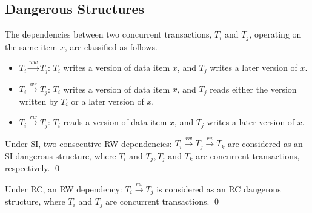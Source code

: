 
\subsection{Dangerous Structures\label{sec:back.vd}}
The dependencies between two concurrent transactions, $T_i$ and $T_j$, operating on the same item $x$, are classified as follows.

\begin{itemize}[leftmargin=*]
    \item $T_i \xrightarrow{ww} T_j$: $T_i$ writes a version of data item $x$, and $T_j$ writes a later version of $x$.
    \item $T_i \xrightarrow{wr} T_j$: $T_i$ writes a version of data item $x$, and $T_j$ reads either the version written by $T_i$ or a later version of $x$.
    \item $T_i \xrightarrow{rw} T_j$: $T_i$ reads a version of data item $x$, and $T_j$ writes a later version of $x$.
\end{itemize}

\begin{definition}
    \label{def:si}
    Under SI, two consecutive RW dependencies: $T_i \xrightarrow{rw} T_j \xrightarrow{rw} T_k$ are considered as an SI dangerous structure, where $T_i$ and $T_j, T_j$ and $T_k$ are concurrent transactions, respectively. %
    \qed
\end{definition}

\begin{definition}
    \label{def:rc}
    Under RC, an RW dependency: $T_i \xrightarrow{rw} T_j$ is considered as an RC dangerous structure, where $T_i$ and $T_j$ are concurrent transactions. %
    \qed
\end{definition}

